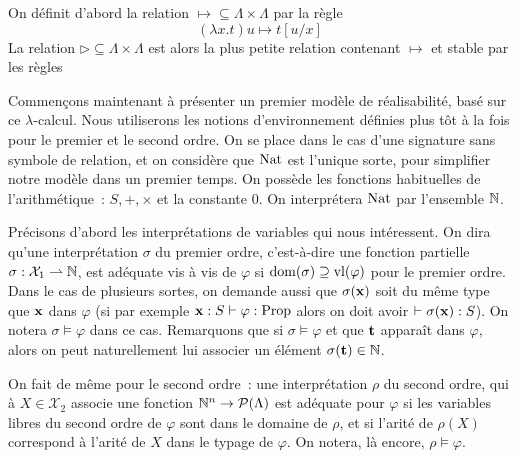 \documentclass{article}
\begin{document}
\begin{defi}
    On définit d'abord la relation $\mapsto\subseteq \Lambda\times\Lambda$ par la règle
    \[(\lambda x.t)u \mapsto t[u/x]\]
    La relation $\rhd\subseteq \Lambda\times\Lambda$ est alors la plus petite relation contenant $\mapsto$ et stable par les règles
    \begin{center}
        \begin{prooftree}
        \end{prooftree}
        \quad
        \begin{prooftree}
        \end{prooftree}
        \quad
        \begin{prooftree}
        \end{prooftree}
    \end{center}
\end{defi}

Commençons maintenant à présenter un premier modèle de réalisabilité, basé sur ce $\lambda$-calcul. Nous utiliserons les notions d'environnement définies plus tôt à la fois pour le premier et le second ordre. On se place dans le cas d'une signature sans symbole de relation, et on considère que $\Nat$ est l'unique sorte, pour simplifier notre modèle dans un premier temps. On possède les fonctions habituelles de l'arithmétique~: $S,+,\times$ et la constante $0$. On interprétera $\Nat$ par l'ensemble $\bN$.

Précisons d'abord les interprétations de variables qui nous intéressent. On dira qu'une interprétation $\sigma$ du premier ordre, c'est-à-dire une fonction partielle $\sigma : \mathcal X_1 \rightharpoonup \bN$, est adéquate vis à vis de $\varphi$ si $\domm(\sigma) \supseteq\varlib{\varphi}$ pour le premier ordre. Dans le cas de plusieurs sortes, on demande aussi que $\sigma(\bx)$ soit du même type que $\bx$ dans $\varphi$ (si par exemple $\bx : S \vdash \varphi : \Propo$ alors on doit avoir $\vdash \sigma(\bx) : S$). On notera $\sigma\models \varphi$ dans ce cas. Remarquons que si $\sigma \models \varphi$ et que $\bt$ apparaît dans $\varphi$, alors on peut naturellement lui associer un élément $\sigma(\bt) \in \bN$.


On fait de même pour le second ordre~: une interprétation $\rho$ du second ordre, qui à $X \in \mathcal X_2$ associe une fonction $\bN^n \to \mathcal P(\Lambda)$ est adéquate pour $\varphi$ si les variables libres du second ordre de $\varphi$ sont dans le domaine de $\rho$, et si l'arité de $\rho(X)$ correspond à l'arité de $X$ dans le typage de $\varphi$. On notera, là encore, $\rho\models \varphi$.
\end{document}
